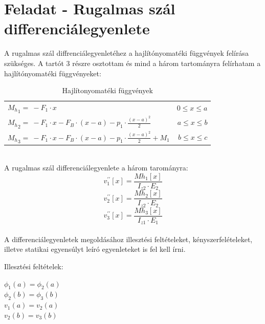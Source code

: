 \documentclass{article}
\begin{document}
	\newpage
	\section{Feladat - Rugalmas szál differenciálegyenlete}
		A rugalmas szál diffrenciálegyenletéhez a hajlítónyomatéki függvények felírása szükséges. A tartót 3 részre osztottam és mind a három tartományra felírhatam a hajlítónyomatéki függvényeket:
		\def\arraystretch{2}
		\begin{table}[h!]
			\begin{center}
				\caption{Hajlítonyomatéki függvények}
				\label{tab:table2}
				\begin{tabular}{l|r} %
					${M_h}_1=\ -F_1\cdot x$ & $0\le x\le a$\\
					${M_h}_2=\ -F_1\cdot x-F_B\cdot\left(x-a\right)-p_1\cdot\frac{\left(x-a\right)^2}{2}$ & $a\le x\le b$\\
					${M_h}_3=\ -F_1\cdot x-F_B\cdot\left(x-a\right)-p_1\cdot\frac{\left(x-a\right)^2}{2}+M_1$ & $b\le x\le c$
				\end{tabular}
			\end{center}
		\end{table}\\[10pt]
		\def\arraystretch{1}%
		A rugalmas szál differenciálegyenlete a három tarományra:
		\begin{equation}
			v_1^{\prime\prime}\left[x\right]=\frac{Mh_1\left[x\right]}{I_{z2}\cdot E_2}
		\end{equation}
		\begin{equation}
			v_2^{\prime\prime}\left[x\right]=\frac{Mh_2\left[x\right]}{I_{z2}\cdot E_2}
		\end{equation}
		\begin{equation}
			v_3^{\prime\prime}\left[x\right]=\frac{Mh_3\left[x\right]}{I_{z1}\cdot E_1}
		\end{equation}\\[10pt]
		A differenciálegyenletek megoldásához illesztési feltételeket, kényszerfelételeket, illetve statikai egyensúlyt leíró egyenleteket is fel kell írni.
		
		Illesztési feltételek:
		\begin{center}
			$\phi_1(a)=\phi_2(a)$\\
			$\phi_2(b)=\phi_3(b)$\\
			$v_1(a)=v_2(a)$\\
			$v_2(b)=v_3(b)$\\
		\end{center}
		
\end{document}
